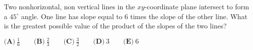Two nonhorizontal, non vertical lines in the $xy$-coordinate plane intersect to form a $45^{\circ}$ angle. One line has slope equal to $6$ times the slope of the other line. What is the greatest possible value of the product of the slopes of the two lines?

$\textbf{(A)}\ \frac16 \qquad\textbf{(B)}\ \frac23 \qquad\textbf{(C)}\  \frac32 \qquad\textbf{(D)}\ 3 \qquad\textbf{(E)}\ 6$